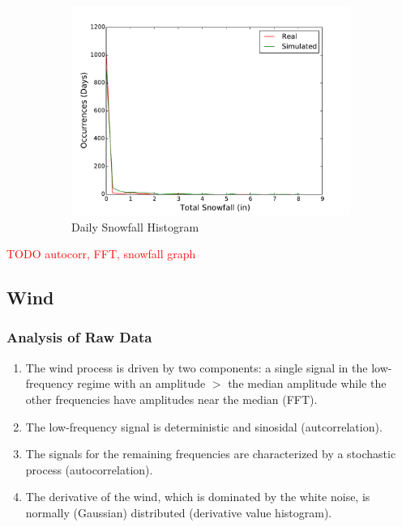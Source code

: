 \documentclass[11pt, letterpaper]{article}
\begin{document}
\begin{figure}[H]
\begin{subfigure}[b]{0.45\textwidth}
    \includegraphics[width=\textwidth]{figures/daily_snowfall_hist}
    \caption{Daily Snowfall Histogram}
  \end{subfigure}
  
  \label{fig:analysis}
  \caption{}
\end{figure}

\textcolor{red}{TODO autocorr, FFT, snowfall graph}

\subsection{Wind}

\subsubsection{Analysis of Raw Data}

\begin{enumerate}
\item The wind process is driven by two components: a single signal in the low-frequency regime with an amplitude $>$ the median amplitude while the other frequencies have amplitudes near the median (FFT).
\item The low-frequency signal is deterministic and sinosidal (autcorrelation).
\item The signals for the remaining frequencies are characterized by a stochastic process (autocorrelation).
\item The derivative of the wind, which is dominated by the white noise, is normally (Gaussian) distributed (derivative value histogram).
\end{enumerate}
\end{document}
